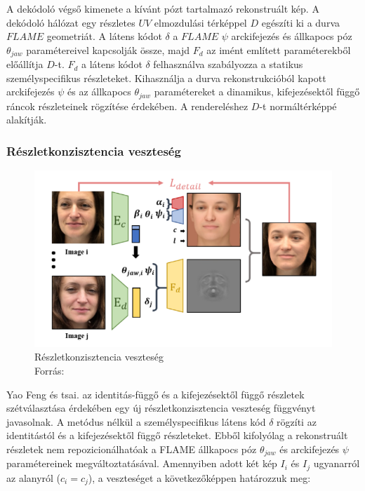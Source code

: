 \documentclass[12pt,a4]{article}
\begin{document}
                A dekódoló végső kimenete a kívánt pózt tartalmazó rekonstruált kép. A dekódoló hálózat egy részletes $UV$ elmozdulási térképpel $D$ egészíti ki a durva $FLAME$ geometriát. A látens kódot $\delta$
     	        a $FLAME$ $\psi$ arckifejezés és állkapocs póz $\theta_{jaw}$ paramétereivel kapcsolják
     	          össze, majd $F_{d}$ az imént említett paraméterekből előállítja $D$-t. 
                $F_{d}$ a látens kódot $\delta$ felhasználva szabályozza a statikus személyspecifikus részleteket. Kihasználja a durva rekonstrukcióból kapott arckifejezés $\psi$ és az állkapocs $\theta_{jaw}$ paramétereket a dinamikus, kifejezésektől függő ráncok részleteinek rögzítése érdekében. A rendereléshez $D$-t normáltérképpé alakítják.

            \subsubsection{Részletkonzisztencia veszteség}
    	 
        	    \begin{figure}[h]	
        	 	     \centering
        	 	     \includegraphics[width=1\linewidth]{ldetail}
        	 	     \caption{Részletkonzisztencia veszteség \\
        	 		    Forrás:\cite{deca}}
                  \label{fig:ldetail}
    	        \end{figure}
    
                Yao Feng és tsai. az identitás-függő és a kifejezésektől függő részletek
     	        szétválasztása érdekében egy új részletkonzisztencia veszteség függvényt
     	        javasolnak. A metódus nélkül a személyspecifikus látens kód $\delta$ rögzíti az
                identitástól és a kifejezésektől függő részleteket. 
                Ebből kifolyólag a rekonstruált részletek nem repozicionálhatóak a FLAME állkapocs póz $\theta_{jaw}$ és arckifejezés $\psi$ paramétereinek megváltoztatásával. Amennyiben adott két kép $I_{i}$ és $I_{j}$ ugyanarról az alanyról ($c_{i} = c_{j}$), a veszteséget a következőképpen határozzuk meg:
        
\end{document}
